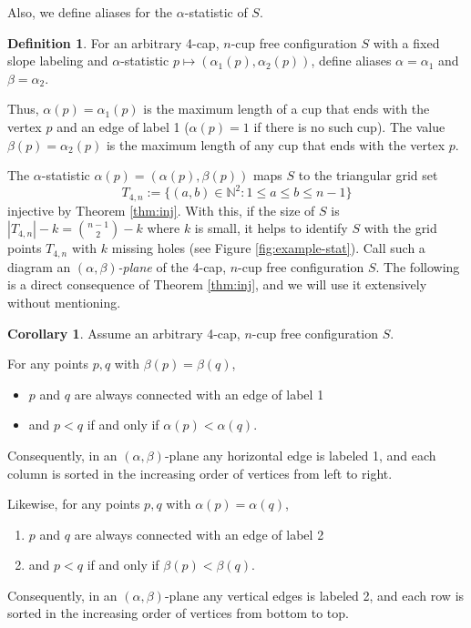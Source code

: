 \documentclass{amsart}
\newcommand{\NN}{\mathbb{N}}
\theoremstyle{definition}
\newtheorem{definition}[thm]{Definition}
\newtheorem{corollary}[thm]{Corollary}
\numberwithin{thm}{section}
\begin{document}
Also, we define aliases for the $\alpha$-statistic of $S$.
\begin{definition}
For an arbitrary 4-cap, $n$-cup free configuration $S$ with a fixed slope labeling and $\alpha$-statistic $p \mapsto (\alpha_1(p), \alpha_2(p))$, define aliases 
$\alpha = \alpha_1$ and $\beta = \alpha_2$.

Thus, $\alpha(p) = \alpha_1(p)$ is the maximum length of a cup that ends with the vertex $p$ and an edge of label 1 ($\alpha(p) = 1$ if there is no such cup).
The value $\beta(p) = \alpha_2(p)$ is the maximum length of any cup that ends with the vertex $p$.
\end{definition}

The $\alpha$-statistic $\alpha(p) = (\alpha(p), \beta(p))$
maps $S$ to the triangular grid set 
$$T_{4, n} := \{(a, b) \in \NN^2 \colon 1 \leq a \leq b \leq n - 1 \}$$ 
injective by Theorem \ref{thm:inj}.
With this, if the size of $S$ is $|T_{4,n}| - k = \binom{n-1}{2} - k$ where $k$ is small, 
it helps to identify $S$ with the grid points $T_{4,n}$ with $k$ missing holes (see Figure \ref{fig:example-stat}).
Call such a diagram an \emph{$(\alpha, \beta)$-plane} of the 4-cap, $n$-cup free configuration $S$.
The following is a direct consequence of Theorem \ref{thm:inj},
and we will use it extensively without mentioning. 

\begin{corollary}
\label{lem:4capfree}
Assume an arbitrary 4-cap, $n$-cup free configuration $S$.

For any points $p, q$ with $\beta(p) = \beta(q)$,
\begin{itemize}
	\item $p$ and $q$ are always connected with an edge of label 1
	\item and $p < q$ if and only if $\alpha(p) < \alpha(q)$.
\end{itemize}
Consequently, in an $(\alpha, \beta)$-plane any horizontal edge is labeled 1, 
and each column is sorted in the increasing order of vertices from left to right.

Likewise, for any points $p, q$ with $\alpha(p) = \alpha(q)$,
\begin{enumerate}
	\item $p$ and $q$ are always connected with an edge of label 2
	\item and $p < q$ if and only if $\beta(p) < \beta(q)$.
\end{enumerate}
Consequently, in an $(\alpha, \beta)$-plane any vertical edges is labeled 2, 
and each row is sorted in the increasing order of vertices from bottom to top.
\end{corollary}
\end{document}
